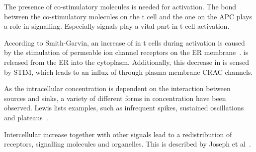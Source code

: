 The presence of co-stimulatory molecules is needed for activation. The bond between the co-stimulatory molecules on the t cell and the one on the APC plays a role in signalling. Especially \Calcium signals play a vital part in t cell activation.

According to Smith-Garvin, an increase of \Calcium in t cells during activation is caused by the stimulation of \Calcium permeable ion channel receptors on the ER membrane~\cite{smith2009}. \Calcium is released from the ER into the cytoplasm. Additionally, this decrease in \Calcium is sensed by STIM, which leads to an influx of \Calcium through plasma membrane CRAC channels.

As the intracellular \Calcium concentration is dependent on the interaction between \Calcium sources and sinks, a variety of different forms in \Calcium concentration have been observed. Lewis lists examples, such as infrequent spikes, sustained oscillations and plateaus~\cite{Lewis2001}.

Intercellular \Calcium increase together with other signals lead to a redistribution of receptors, signalling molecules and organelles. This is described by Joseph et al~\cite{joseph2014}.